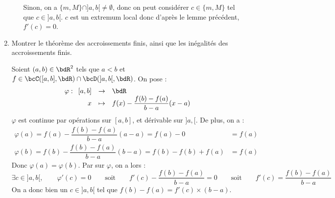 \documentclass[a4paper,french,bookmarks]{article}
\begin{document}
\begin{enumerate}
\begin{nproof}
\begin{enumerate}
            \ithand Sinon, on a $\{m, M\} \cap ]a, b[ \neq \emptyset$, donc on peut considérer $c \in \{m, M\}$ tel que $c \in ]a, b[$. $c$ est un extremum local donc d'après le lemme  précédent, $f'(c) = 0$. 
        \end{enumerate}
    \end{nproof}
	\yesbefore
    
    \item Montrer le théorème des accroissements finis, ainsi que les inégalités des accroissements finis.
    
    \noafter
    \boxans{
        \begin{theorem}{Théorème des accroissements finis}{TAF}
            Soient $(a, b) \in \bdR^2$ tels que $a < b$ et $f \in \bcC([a, b], \bdR) \cap \bcD(]a, b[, \bdR)$. On a :
            \[ \hg{\exists c \in ]a, b[,\qquad f(b) - f(a) = (b-a)f'(c)}\]
        \end{theorem}
    }
    \nobefore
    \begin{nproof}
        Soient $(a, b) \in \bdR^2$ tels que $a < b$ et $f \in \bcC([a, b], \bdR) \cap \bcD(]a, b[, \bdR)$. On pose :
        \[\varphi : \begin{array}[t]{rcl}
            [a, b] &\to&\bdR  \\
            x &\mapsto& f(x) - \dfrac{f(b)-f(a)}{b-a}(x-a) 
        \end{array}\]
        $\varphi$ est continue par opérations sur $[a, b]$, et dérivable sur $]a, [$. De plus, on a :
        \[ \begin{array}{ll}
            \varphi(a) = f(a) - \dfrac{f(b)-f(a)}{b-a}(a-a) = f(a) - 0 &= f(a) \\
            \varphi(b) = f(b) - \dfrac{f(b)-f(a)}{b-a}(b-a) = f(b) - f(b) + f(a) &= f(a)
        \end{array} \]
        Donc $\varphi(a) = \varphi(b)$. Par  sur $\varphi$, on a lors :
        \[ \exists c \in ]a, b[,\qquad \varphi'(c) = 0\qquad\text{soit}\qquad f'(c) - \dfrac{f(b)-f(a)}{b-a} = 0\qquad\text{soit}\qquad f'(c) = \dfrac{f(b)-f(a)}{b-a}\]
        On a donc bien un $c \in ]a, b[$ tel que $f(b) - f(a) = f'(c)\times(b-a)$.
    \end{nproof}
	\boxans{
        \begin{corollary}{Inégalité des accroissements finis}{IAF}
            Soient $(a, b) \in \bdR^2$ tels que $a < b$ et $f \in \bcC([a, b], \bdR) \cap \bcD(]a, b[, \bdR)$. On a :

\end{corollary}}
\end{enumerate}
\end{document}
